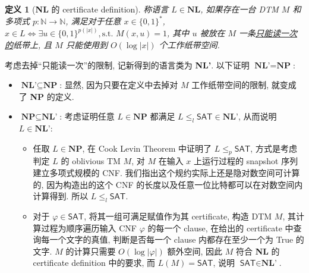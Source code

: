 \documentclass[8pt]{article}
\theoremstyle{compact}
\newtheorem{definition}{定义}
\def\le{\leqslant}
\begin{document}
\section{}
\begin{definition}[\textbf{NL} 的 certificate definition]
	称语言 $L \in \textbf{NL}$, 如果存在一台 DTM $M$ 和多项式 $p: \mathbb N \to \mathbb N$, 满足对于任意 $x \in \{0, 1\}^*$, $x \in L \Leftrightarrow \exists u \in \{0, 1\}^{p(|x|)}, \text{s.t. } M(x, u) = 1$, 其中 $u$ 被放在 $M$ 一条\uline{只能读一次的}纸带上, 且 $M$ 只能使用到 $O(\log |x|)$ 个工作纸带空间.
\end{definition}

考虑去掉“只能读一次”的限制, 记新得到的语言类为 \textbf{NL'}. 以下证明 $\textbf{NL'} = \textbf{NP}$:
\begin{itemize}
	\item $\textbf{NL'} \subseteq \textbf{NP}$: 显然, 因为只要在定义中去掉对 $M$ 工作纸带空间的限制, 就变成了 \textbf{NP} 的定义.
	\item $\textbf{NP} \subseteq \textbf{NL'}$: 考虑证明任意 $L \in \textbf{NP}$ 都满足 $L \le_l \textsf{SAT} \in \textbf{NL'}$, 从而说明 $L \in \textbf{NL'}$:
	\begin{itemize}
		\item 任取 $L \in \textbf{NP}$, 在 Cook Levin Theorem 中证明了 $L \le_p \textsf{SAT}$, 方式是考虑判定 $L$ 的 oblivious TM $M$, 对 $M$ 在输入 $x$ 上运行过程的 snapshot 序列建立多项式规模的 CNF. 我们指出这个规约实际上还是隐对数空间可计算的, 因为构造出的这个 CNF 的长度以及任意一位比特都可以在对数空间内计算得到. 所以 $L \le_l \textsf{SAT}$.
		\item 对于 $\varphi \in \textsf{SAT}$, 将其一组可满足赋值作为其 certificate, 构造 DTM $M$, 其计算过程为顺序遍历输入 CNF $\varphi$ 的每一个 clause, 在给出的 certificate 中查询每一个文字的真值, 判断是否每一个 clause 内都存在至少一个为 True 的文字. $M$ 的计算只需要 $O(\log |\varphi|)$ 额外空间, 因此 $M$ 符合 \textbf{NL} 的 certificate definition 中的要求, 而 $L(M) = \textsf{SAT}$, 说明 $\textsf{SAT} \in \textbf{NL'}$.
	\end{itemize}
\end{itemize}
\end{document}
